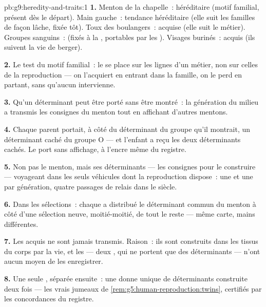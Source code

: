 \begin{solution}{pb:g9:heredity-and-traits:1}
\textbf{1.} Menton de la chapelle~: héréditaire (motif
familial, présent dès le départ). Main gauche~: tendance
héréditaire (elle suit les familles de façon lâche, fixée
tôt). Toux des boulangers~: acquise (elle suit le métier).
Groupes sanguins~:  (fixés à la ,
portables par les ). Visages burinés~: acquis (ils
suivent la vie de berger).

\textbf{2.} Le test du motif familial~: le  se
place sur les lignes d'un métier, non sur celles de la
reproduction --- on l'acquiert en entrant dans la famille,
on le perd en partant, sans qu'aucun  intervienne.

\textbf{3.} Qu'un déterminant peut être porté sans être
montré~: la génération du milieu a transmis les consignes
du menton tout en affichant d'autres mentons.

\textbf{4.} Chaque parent portait, à côté du déterminant du
groupe qu'il montrait, un déterminant caché du groupe O ---
et l'enfant a reçu les deux déterminants cachés. Le port
sans affichage, à l'encre même du registre.

\textbf{5.} Non pas le menton, mais ses déterminants ---
les consignes pour le construire --- voyageant dans les
seuls véhicules dont la reproduction dispose~: une  et une  par génération, quatre passages de
relais dans le siècle.

\textbf{6.} Dans les sélections~: chaque  a
distribué le déterminant commun du menton à côté d'une
sélection neuve, moitié-moitié, de tout le reste --- même
carte, mains différentes.

\textbf{7.} Les  acquis ne sont jamais transmis.
Raison~: ils sont construits dans les tissus du corps par
la vie, et les  --- deux , qui ne portent
que des déterminants --- n'ont aucun moyen de les
enregistrer.

\textbf{8.} Une seule , séparée ensuite~: une
donne unique de déterminants construite deux fois --- les
vrais jumeaux de \cref{rem:g5:human-reproduction:twins},
certifiés par les concordances du registre.


\end{solution}
